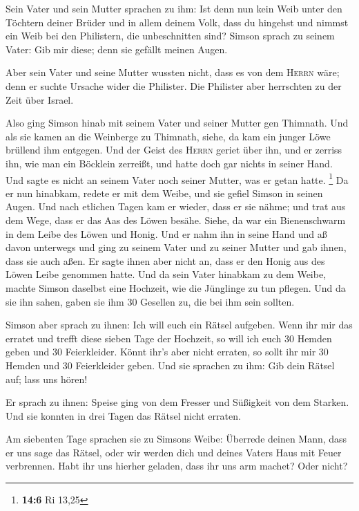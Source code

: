  Sein Vater und sein Mutter sprachen zu ihm: Ist denn nun
kein Weib unter den Töchtern deiner Brüder und in allem deinem Volk,
dass du hingehst und nimmst ein Weib bei den Philistern, die
unbeschnitten sind? Simson sprach zu seinem Vater: Gib mir diese; denn
sie gefällt meinen Augen.

 Aber sein Vater und seine Mutter wussten nicht, dass es
von dem \textsc{Herrn} wäre; denn er suchte Ursache wider die Philister.
Die Philister aber herrschten zu der Zeit über Israel.

 Also ging Simson hinab mit seinem Vater und seiner Mutter
gen Thimnath. Und als sie kamen an die Weinberge zu Thimnath, siehe, da
kam ein junger Löwe brüllend ihm entgegen.  Und der Geist
des \textsc{Herrn} geriet über ihn, und er zerriss ihn, wie man ein
Böcklein zerreißt, und hatte doch gar nichts in seiner Hand. Und sagte
es nicht an seinem Vater noch seiner Mutter, was er getan hatte.
\footnote{\textbf{14:6} Ri 13,25}  Da er nun hinabkam,
redete er mit dem Weibe, und sie gefiel Simson in seinen Augen.
 Und nach etlichen Tagen kam er wieder, dass er sie nähme;
und trat aus dem Wege, dass er das Aas des Löwen besähe. Siehe, da war
ein Bienenschwarm in dem Leibe des Löwen und Honig.  Und
er nahm ihn in seine Hand und aß davon unterwegs und ging zu seinem
Vater und zu seiner Mutter und gab ihnen, dass sie auch aßen. Er sagte
ihnen aber nicht an, dass er den Honig aus des Löwen Leibe genommen
hatte.  Und da sein Vater hinabkam zu dem Weibe, machte
Simson daselbst eine Hochzeit, wie die Jünglinge zu tun pflegen.
 Und da sie ihn sahen, gaben sie ihm 30 Gesellen zu, die
bei ihm sein sollten.

 Simson aber sprach zu ihnen: Ich will euch ein Rätsel
aufgeben. Wenn ihr mir das erratet und trefft diese sieben Tage der
Hochzeit, so will ich euch 30 Hemden geben und 30 Feierkleider.
 Könnt ihr's aber nicht erraten, so sollt ihr mir 30
Hemden und 30 Feierkleider geben. Und sie sprachen zu ihm: Gib dein
Rätsel auf; lass uns hören!

 Er sprach zu ihnen: Speise ging von dem Fresser und
Süßigkeit von dem Starken. Und sie konnten in drei Tagen das Rätsel
nicht erraten.

 Am siebenten Tage sprachen sie zu Simsons Weibe:
Überrede deinen Mann, dass er uns sage das Rätsel, oder wir werden dich
und deines Vaters Haus mit Feuer verbrennen. Habt ihr uns hierher
geladen, dass ihr uns arm machet? Oder nicht?

